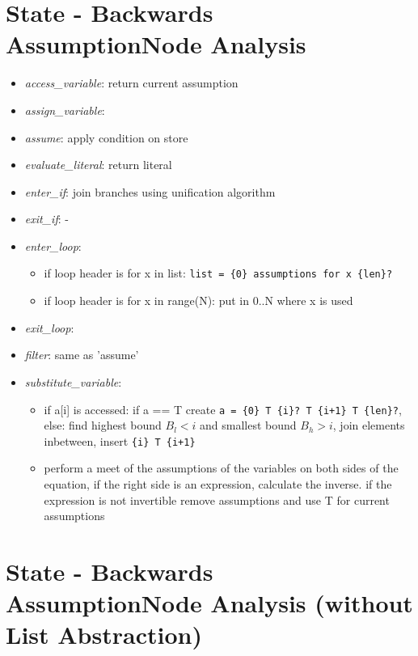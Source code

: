 \documentclass[11pt]{article}
\begin{document}
\section{State - Backwards AssumptionNode Analysis}

\begin{itemize}
\item \textit{access\_variable}: return current assumption
\item \textit{assign\_variable}:
\item \textit{assume}: apply condition on store
\item \textit{evaluate\_literal}: return literal
\item \textit{enter\_if}: join branches using unification algorithm
\item \textit{exit\_if}: -
\item \textit{enter\_loop}:
\begin{itemize}
\item if loop header is for x in list: \verb|list = {0} assumptions for x {len}?|
\item if loop header is for x in range(N): put in 0..N where x is used
\end{itemize}
\item \textit{exit\_loop}:
\item \textit{filter}: same as 'assume'
\item \textit{substitute\_variable}:
\begin{itemize}
\item if a[i] is accessed: if a == T create \verb|a = {0} T {i}? T {i+1} T {len}?|, else: find highest bound $B_l < i$ and smallest bound $B_h > i$, join elements inbetween, insert \verb|{i} T {i+1}|
\item perform a meet of the assumptions of the variables on both sides of the equation, if the right side is an expression, calculate the inverse. if the expression is not invertible remove assumptions and use T for current assumptions
\end{itemize}
\end{itemize}


\section{State - Backwards AssumptionNode Analysis (without List Abstraction)}
\end{document}
